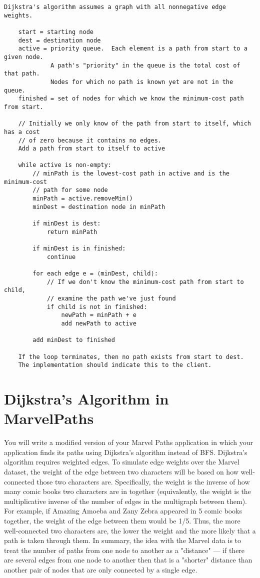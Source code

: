 \documentclass[11pt]{article}
\begin{document}
\newpage

\begin{verbatim}
Dijkstra's algorithm assumes a graph with all nonnegative edge weights.
 
    start = starting node
    dest = destination node
    active = priority queue.  Each element is a path from start to a given node.
             A path's "priority" in the queue is the total cost of that path.
             Nodes for which no path is known yet are not in the queue.
    finished = set of nodes for which we know the minimum-cost path from start.
 
    // Initially we only know of the path from start to itself, which has a cost
    // of zero because it contains no edges.
    Add a path from start to itself to active
 
    while active is non-empty:
        // minPath is the lowest-cost path in active and is the minimum-cost
        // path for some node
        minPath = active.removeMin()
        minDest = destination node in minPath
        
        if minDest is dest:
            return minPath
 
        if minDest is in finished:
            continue
 
        for each edge e = ⟨minDest, child⟩:
            // If we don't know the minimum-cost path from start to child,
            // examine the path we've just found
            if child is not in finished:
                newPath = minPath + e
                add newPath to active
 
        add minDest to finished
 
    If the loop terminates, then no path exists from start to dest.
    The implementation should indicate this to the client.
\end{verbatim}

\newpage

\section*{Dijkstra's Algorithm in MarvelPaths}
\label{sec:MarvelPaths}

\noindent You will write a modified version of your Marvel Paths application in which your application finds its paths using Dijkstra's algorithm instead of BFS. Dijkstra's algorithm requires weighted edges. To simulate edge weights over the Marvel dataset, the weight of the edge between two characters will be based on how well-connected those two characters are. Specifically, the weight is the inverse of how many comic books two characters are in together (equivalently, the weight is the multiplicative inverse of the number of edges in the multigraph between them). For example, if Amazing Amoeba and Zany Zebra appeared in 5 comic books together, the weight of the edge between them would be 1/5. Thus, the more well-connected two characters are, the lower the weight and the more likely that a path is taken through them. In summary, the idea with the Marvel data is to treat the number of paths from one node to another as a "distance" — if there are several edges from one node to another then that is a "shorter" distance than another pair of nodes that are only connected by a single edge.
\end{document}
